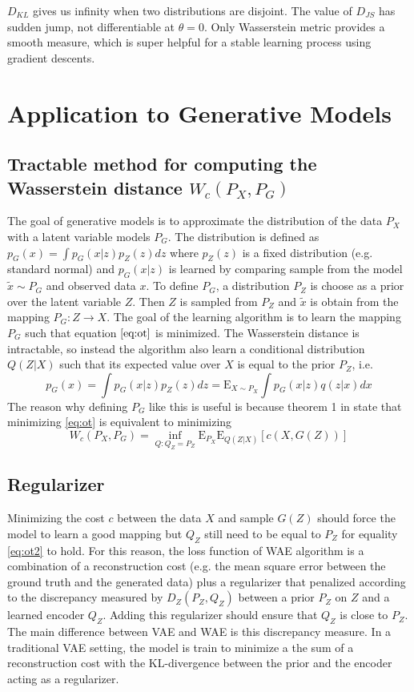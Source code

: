 \documentclass[12pt,english]{amsart}
\newcommand{\E}{\mathrm{E}}
\begin{document}
$D_{KL}$ gives us infinity when two distributions are disjoint. The value of
$D_{JS}$ has sudden jump, not differentiable at $\theta=0$. Only Wasserstein
metric provides a smooth measure, which is super helpful for a stable learning
process using gradient descents.

\section{Application to Generative Models} 

\subsection{Tractable method for computing the Wasserstein distance $W_c(P_X, P_G)$}

The goal of generative models is to approximate the distribution of the data $P_X$ with a latent variable models $P_G$. The distribution is defined as $p_G(x) = \int p_G(x|z)p_Z(z)dz$ where $p_Z(z)$ is a fixed distribution (e.g. standard normal) and $p_G(x|z)$ is learned by comparing sample from the model $\tilde{x}\sim P_G$ and observed data $x$. To define $P_G$, a distribution $P_Z$ is choose as a prior over the latent variable $Z$. Then $Z$ is sampled from $P_Z$ and $\tilde{x}$ is obtain from the mapping $P_G: Z \rightarrow X$. The goal of the learning algorithm is to learn the mapping $P_G$ such that equation $\eqref{eq:ot}$ is minimized. The Wasserstein distance is intractable, so instead the algorithm also learn a conditional distribution $Q(Z|X)$ such that its expected value over $X$ is equal to the prior $P_Z$, i.e.
\[
 p_G(x) = \int p_G(x|z)p_Z(z)dz = \E_{X\sim P_X}\int p_G(x|z)q(z|x)dx
\]
The reason why defining $P_G$ like this is useful is because theorem 1 in \cite{2017arXiv171101558T} state that minimizing \eqref{eq:ot} is equivalent to minimizing
\begin{equation}
 W_c(P_X, P_G)=\inf_{Q:Q_Z=P_Z}\E_{P_X}\E_{Q(Z|X)}[c(X, G(Z))]
 \label{eq:ot2}
\end{equation}

\subsection{Regularizer}
Minimizing the cost $c$ between the data $X$ and sample $G(Z)$ should force the model to learn a good mapping but $Q_Z$ still need to be equal to $P_Z$ for equality \eqref{eq:ot2} to hold. For this reason, the loss function of WAE algorithm is a combination of a reconstruction cost (e.g. the mean square error between the ground truth and the generated data) plus a regularizer that penalized according to the discrepancy measured by $D_{Z}(P_Z, Q_Z)$ between a prior $P_Z$ on $Z$ and a learned encoder $Q_Z$. Adding this regularizer should ensure that $Q_Z$ is close to $P_Z$. The main difference between VAE and WAE is this discrepancy measure. In a traditional VAE setting, the model is train to minimize a the sum of a reconstruction cost with the KL-divergence between the prior and the encoder acting as a regularizer. \\
\end{document}
